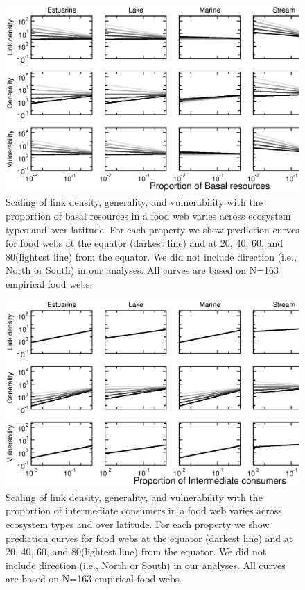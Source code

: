 \documentclass[12pt]{article}
\begin{document}
\begin{spacing}{1.0}
\begin{figure}[!H]
\includegraphics[width=.9\textwidth]{Figures/by_TL/scaling_with_S/proportions/B_latlines_nonts.eps}
\caption{Scaling of link density, generality, and vulnerability 
with the proportion of basal resources in a food web
varies across ecosystem types and over latitude. For each property we show 
prediction curves for food webs at the equator (darkest line) and at 
20\degree, 40\degree, 60\degree, and 80\degree (lightest line) from the 
equator. We did not include direction (i.e., North or South) in our analyses. 
All curves are based on N=163 empirical food webs.}
\label{B}
\end{figure}

\newpage


\begin{figure}[h]
\includegraphics[width=.9\textwidth]{Figures/by_TL/scaling_with_S/proportions/I_latlines_nonts.eps}
\caption{Scaling of link density, generality, and vulnerability 
with the proportion of intermediate consumers in a food web
varies across ecosystem types and over latitude. For each property we show 
prediction curves for food webs at the equator (darkest line) and at 
20\degree, 40\degree, 60\degree, and 80\degree (lightest line) from the 
equator. We did not include direction (i.e., North or South) in our analyses. 
All curves are based on N=163 empirical food webs.}
\label{I}
\end{figure}



\end{spacing}
\end{document}
